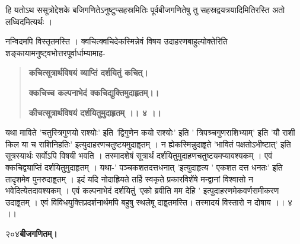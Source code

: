 \documentclass[11pt, openany]{book}
\begin{document}
\begin{sloppypar}
\hangindent=0.2in \hspace{0.2in}हि यतोऽथ ससूत्रोद्देशके बजिगणितेऽनुष्टुप्सहस्रमितिः पूर्वबीजगणितेषु तु सहस्रद्वयत्रयादिमितिरस्ति अतो लध्विदमित्यर्थः । 

\hangindent=0.2in \hspace{0.2in}नन्विदमपि विस्तृतमस्ति । क्वचित्क्वचिदेकस्मिन्नेवं विषय उदाहरणबाहुल्पोक्तेरिति शङ्कायामनुष्ट्वभोत्तरपूर्वार्धाम्यामाह- 

\begin{quote}
\hspace{1in}\textbf{कचित्सूत्रार्थविषयं व्याप्तिं दर्शयितुं कचित्।}

\hspace{1in}\textbf{क्कचिच्च कल्पनाभेदं क्कचिद्युक्तिमुदाहृतम्।।}

\hspace{1in}\textbf{कीचत्सूत्रार्थविषयं दर्शयितुमुदाहृतम् ।। ४ ।।}
\end{quote}

\hangindent=0.2in \hspace{0.2in}यथा माविते 'चतुस्त्रिगुणयो राश्योः' इति 'द्विगुणेन कयो राश्योः' इति ' त्रिपश्र्चगुणराशिभ्याम्' इति 'यौ राशी किल या च राशिनिहतिः' इत्युदाहरणचतुष्टयमुदाहॄतम् । न ह्येकस्मिन्नुदाहॄते 'भावितं पक्षतोऽभीष्टात्' इति सूत्रस्यार्थः सर्वोऽपि विषयी भवति । तस्मादशेषं सूत्रार्थं दर्शयितुमुदाहणचतुष्टयमप्यावश्यकम् । एवं क्कचिद्व्याप्तिं दर्शयितुमुदाहृतम् । यथा-' पञ्चकशतदत्तधनात् 'इत्युदाहृत्य ' एकशत दत्त धनतः' इति तादृशमेव पुनरुदाहॄतम् । इदं यदि नोदाह्रियते तर्हि स्वकृते प्रकारविशेंषे मन्द्वानां विश्वासो न भवेदित्येतदावश्यकम् । एवं कल्पनाभेदं दर्शयितुं 'एको ब्रवीति मम देहि ' इत्पुदाहरणमेकवर्णसमीकरण उदाहॄतम् । एवं विविधयुक्तिप्रदर्शनार्थमपि बहुषु स्थलेषू दाहॄतमस्ति। तस्मादयं विस्तारो न दोषाय ।। ४ ।।
\end{sloppypar}
\thispagestyle{empty}
\newpage

\onehalfspacing
२०४\hspace{2in}\textbf{बीजगणितम्।} 

\vspace{5mm}
\end{document}
